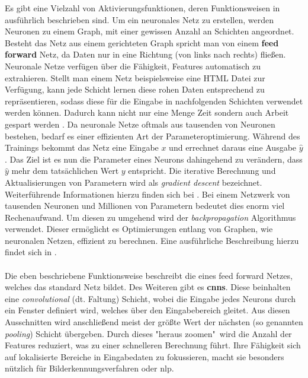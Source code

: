 \documentclass[
    12pt, %
    DIV10,
    ngerman, %
    a4paper, %
    oneside, %
    titlepage, %
    parskip=half, %
    headings=normal, %
    listof=totoc, %
    bibliography=totoc, %
    index=totoc, %
    captions=tableheading, %
    final %
]{scrreprt}
\begin{document}
Es gibt eine Vielzahl von Aktivierungsfunktionen, deren Funktionsweisen in \textcite{JoshuaSaxe2018} ausführlich beschrieben sind. Um ein neuronales Netz zu erstellen, werden Neuronen zu einem Graph, mit einer gewissen Anzahl an Schichten angeordnet. Besteht das Netz aus einem gerichteten Graph spricht man von einem \textbf{feed forward} Netz, da Daten nur in eine Richtung (von links nach rechts) fließen. Neuronale Netze verfügen über die Fähigkeit, Features automatisch zu extrahieren. Stellt man einem Netz  beispielsweise eine HTML Datei zur Verfügung, kann jede Schicht lernen diese rohen Daten entsprechend zu repräsentieren, sodass diese für die Eingabe in nachfolgenden Schichten verwendet werden können. Dadurch kann nicht nur eine Menge Zeit sondern auch Arbeit gespart werden \parencite{JoshuaSaxe2018}. Da neuronale Netze oftmals aus tausenden von Neuronen bestehen, bedarf es einer effizienten Art der Parameteroptimierung. Während des Trainings bekommt das Netz eine Eingabe $x$ und errechnet daraus eine Ausgabe $\hat{y}$. Das Ziel ist es nun die Parameter eines Neurons dahingehend zu verändern, dass $\hat{y}$ mehr dem tatsächlichen Wert $y$ entspricht. Die iterative Berechnung und Aktualisierungen von Parametern wird als \emph{gradient descent} bezeichnet. Weiterführende Informationen hierzu finden sich bei \textcite{bonaccorso2018python}. Bei einem Netzwerk von tausenden Neuronen und Millionen von Parametern bedeutet dies enorm viel Rechenaufwand. Um diesen zu umgehend wird der \emph{backpropagation} Algorithmus verwendet. Dieser ermöglicht es Optimierungen entlang von Graphen, wie neuronalen Netzen, effizient zu berechnen. Eine ausführliche Beschreibung hierzu findet sich in \textcite{krohn2019deep}.\\\\
Die eben beschriebene Funktionsweise beschreibt die eines feed forward Netzes, welches das standard Netz bildet. Des Weiteren gibt es \textbf{\ac{cnns}}. Diese beinhalten eine \emph{convolutional} (dt. Faltung) Schicht, wobei die Eingabe jedes Neurons durch ein Fenster definiert wird, welches über den Eingabebereich gleitet. Aus diesen Ausschnitten wird anschließend meist der größte Wert der nächsten (so genannten \emph{pooling}) Schicht übergeben. Durch dieses "heraus zoomen"\ wird die Anzahl der Features reduziert, was zu einer schnelleren Berechnung führt. Ihre Fähigkeit sich auf lokalisierte Bereiche in Eingabedaten zu fokussieren, macht sie besonders nützlich für Bilderkennungsverfahren oder \ac{nlp}.\\\\
\end{document}
